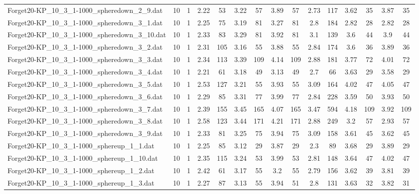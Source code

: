 \begin{table}[!ht]
{\begin{tabular}{lcccccccccccccc}
Forget20-KP\_10\_3\_1-1000\_spheredown\_2\_9.dat & 10 & 1 & 2.22 & 53 & 3.22 & 57 & 3.89 & 57 & 2.73 & 117 & 3.62 & 35 & 3.87 & 35 \\
Forget20-KP\_10\_3\_1-1000\_spheredown\_3\_1.dat & 10 & 1 & 2.25 & 75 & 3.19 & 81 & 3.27 & 81 & 2.8 & 184 & 2.82 & 28 & 2.82 & 28 \\
Forget20-KP\_10\_3\_1-1000\_spheredown\_3\_10.dat & 10 & 1 & 2.33 & 83 & 3.29 & 81 & 3.92 & 81 & 3.1 & 139 & 3.6 & 44 & 3.9 & 44 \\
Forget20-KP\_10\_3\_1-1000\_spheredown\_3\_2.dat & 10 & 1 & 2.31 & 105 & 3.16 & 55 & 3.88 & 55 & 2.84 & 174 & 3.6 & 36 & 3.89 & 36 \\
Forget20-KP\_10\_3\_1-1000\_spheredown\_3\_3.dat & 10 & 1 & 2.34 & 113 & 3.39 & 109 & 4.14 & 109 & 2.88 & 181 & 3.77 & 72 & 4.01 & 72 \\
Forget20-KP\_10\_3\_1-1000\_spheredown\_3\_4.dat & 10 & 1 & 2.21 & 61 & 3.18 & 49 & 3.13 & 49 & 2.7 & 66 & 3.63 & 29 & 3.58 & 29 \\
Forget20-KP\_10\_3\_1-1000\_spheredown\_3\_5.dat & 10 & 1 & 2.53 & 127 & 3.21 & 55 & 3.93 & 55 & 3.09 & 164 & 4.02 & 47 & 4.05 & 47 \\
Forget20-KP\_10\_3\_1-1000\_spheredown\_3\_6.dat & 10 & 1 & 2.29 & 85 & 3.31 & 77 & 3.99 & 77 & 2.84 & 228 & 3.59 & 50 & 3.93 & 50 \\
Forget20-KP\_10\_3\_1-1000\_spheredown\_3\_7.dat & 10 & 1 & 2.39 & 155 & 3.45 & 165 & 4.07 & 165 & 3.47 & 594 & 4.18 & 109 & 3.92 & 109 \\
Forget20-KP\_10\_3\_1-1000\_spheredown\_3\_8.dat & 10 & 1 & 2.58 & 123 & 3.44 & 171 & 4.21 & 171 & 2.88 & 249 & 3.2 & 57 & 2.93 & 57 \\
Forget20-KP\_10\_3\_1-1000\_spheredown\_3\_9.dat & 10 & 1 & 2.33 & 81 & 3.25 & 75 & 3.94 & 75 & 3.09 & 158 & 3.61 & 45 & 3.62 & 45 \\
Forget20-KP\_10\_3\_1-1000\_sphereup\_1\_1.dat & 10 & 1 & 2.25 & 85 & 3.12 & 29 & 3.87 & 29 & 2.3 & 89 & 3.68 & 29 & 3.89 & 29 \\
Forget20-KP\_10\_3\_1-1000\_sphereup\_1\_10.dat & 10 & 1 & 2.35 & 115 & 3.24 & 53 & 3.99 & 53 & 2.81 & 148 & 3.64 & 47 & 4.02 & 47 \\
Forget20-KP\_10\_3\_1-1000\_sphereup\_1\_2.dat & 10 & 1 & 2.42 & 61 & 3.17 & 55 & 3.2 & 55 & 2.79 & 156 & 3.62 & 39 & 3.81 & 39 \\
Forget20-KP\_10\_3\_1-1000\_sphereup\_1\_3.dat & 10 & 1 & 2.27 & 87 & 3.13 & 55 & 3.94 & 51 & 2.8 & 131 & 3.63 & 32 & 3.82 & 31 \\

\end{tabular}}
\end{table}

